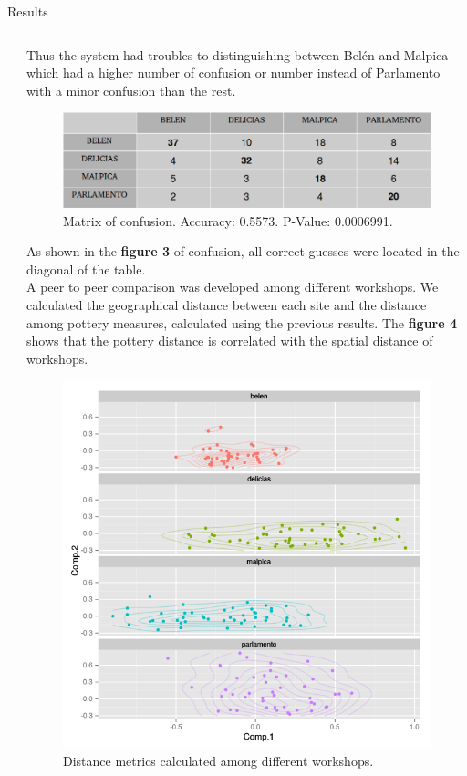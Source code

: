 \documentclass[final]{beamer}
\newlength{\twocolwid}
\begin{document}
\begin{frame}[t]
\begin{columns}[t]
\begin{column}{\twocolwid}
\begin{block}{Results}
\begin{columns}
\begin{column}{0.48\textwidth}
\end{column}

\begin{column}{0.48\textwidth}

\justify

 Thus the system had troubles to distinguishing between Bel\'en and Malpica which had a higher number of confusion or number instead of Parlamento with a minor confusion than the rest. 

 
\begin{figure}
\includegraphics[width=0.6\linewidth]{fig3.png}
\caption{Matrix of confusion. Accuracy: 0.5573. P-Value: 0.0006991.}
\end{figure}

\justify
As shown in the \textbf{figure 3} of confusion, all correct guesses were located in the diagonal of the table.\\
A peer to peer comparison was developed among different workshops. We calculated the geographical distance between each site and the distance among pottery measures, calculated using the previous results. The \textbf{figure 4}  shows that the pottery distance is correlated with the spatial distance of workshops.  

\begin{figure}
\includegraphics[width=0.7\linewidth]{fig2.png}
\caption{Distance metrics calculated among different workshops.}
\end{figure}


\end{column}
\end{columns}
\end{block}
\end{column}
\end{columns}
\end{frame}
\end{document}
